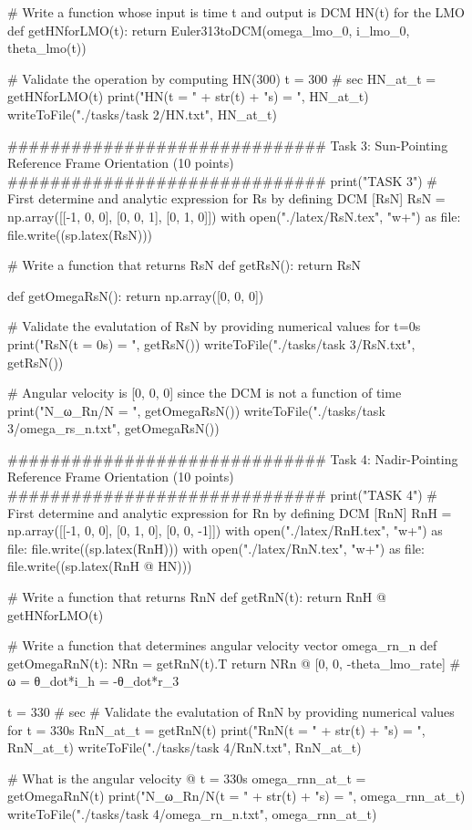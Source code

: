 \documentclass[conf]{new-aiaa}
\begin{document}
\begin{pythoncode}
# Write a function whose input is time t and output is DCM HN(t) for the LMO
def getHNforLMO(t):
    return Euler313toDCM(omega_lmo_0, i_lmo_0, theta_lmo(t))


# Validate the operation by computing HN(300)
t = 300  # sec
HN_at_t = getHNforLMO(t)
print("HN(t = " + str(t) + "s) = ", HN_at_t)
writeToFile("./tasks/task 2/HN.txt", HN_at_t)


############################## Task 3: Sun-Pointing Reference Frame Orientation (10 points) ##############################
print("\n\nBEGIN TASK 3")
# First determine and analytic expression for Rs by defining DCM [RsN]
RsN = np.array([[-1, 0, 0], [0, 0, 1], [0, 1, 0]])
with open("./latex/RsN.tex", "w+") as file:
    file.write((sp.latex(RsN)))


# Write a function that returns RsN
def getRsN():
    return RsN


def getOmegaRsN():
    return np.array([0, 0, 0])


# Validate the evalutation of RsN by providing numerical values for t=0s
print("RsN(t = 0s) = ", getRsN())
writeToFile("./tasks/task 3/RsN.txt", getRsN())

# Angular velocity is [0, 0, 0] since the DCM is not a function of time
print("N_ω_Rn/N = ", getOmegaRsN())
writeToFile("./tasks/task 3/omega_rs_n.txt", getOmegaRsN())


############################## Task 4: Nadir-Pointing Reference Frame Orientation (10 points) ##############################
print("\n\nBEGIN TASK 4")
# First determine and analytic expression for Rn by defining DCM [RnN]
RnH = np.array([[-1, 0, 0], [0, 1, 0], [0, 0, -1]])
with open("./latex/RnH.tex", "w+") as file:
    file.write((sp.latex(RnH)))
with open("./latex/RnN.tex", "w+") as file:
    file.write((sp.latex(RnH @ HN)))


# Write a function that returns RnN
def getRnN(t):
    return RnH @ getHNforLMO(t)


# Write a function that determines angular velocity vector omega_rn_n
def getOmegaRnN(t):
    NRn = getRnN(t).T
    return NRn @ [0, 0, -theta_lmo_rate]  # ω = θ_dot*i_h = -θ_dot*r_3


t = 330  # sec
# Validate the evalutation of RnN by providing numerical values for t = 330s
RnN_at_t = getRnN(t)
print("RnN(t = " + str(t) + "s) = ", RnN_at_t)
writeToFile("./tasks/task 4/RnN.txt", RnN_at_t)

# What is the angular velocity @ t = 330s
omega_rnn_at_t = getOmegaRnN(t)
print("N_ω_Rn/N(t = " + str(t) + "s) = ", omega_rnn_at_t)
writeToFile("./tasks/task 4/omega_rn_n.txt", omega_rnn_at_t)



\end{pythoncode}
\end{document}

